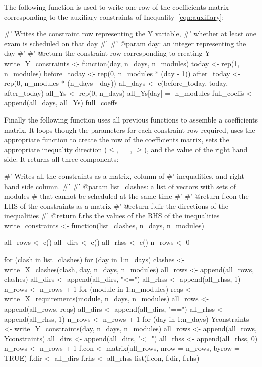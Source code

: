 The following function is used to write one row of the coefficients matrix
corresponding to the auxiliary constraints of Inequality~\ref{eqn:auxiliary}:

\begin{Rin-no-test}
#' Writes the constraint row representing the Y variable,
#' whether at least one exam is scheduled on that day
#'
#' @param day: an integer representing the day
#'
#' @return the constraint row corresponding to creating Y
write_Y_constraints <- function(day, n_days, n_modules){
  today <- rep(1, n_modules)
  before_today <- rep(0, n_modules * (day - 1))
  after_today <- rep(0, n_modules * (n_days - day))
  all_days <- c(before_today, today, after_today)
  all_Ys <- rep(0, n_days)
  all_Ys[day] = -n_modules
  full_coeffs <- append(all_days, all_Ys)
  full_coeffs
}
\end{Rin-no-test}

Finally the following function uses all previous functions
to assemble a coefficients matrix.
It loops though the parameters for each constraint row required, uses the
appropriate function to create the row of the coefficients matrix, sets the
appropriate inequality direction (\(\leq\), \(=\), \(\geq\)), and the value of the
right hand side.
It returns all three components:

\begin{Rin-no-test}
#' Writes all the constraints as a matrix, column of
#' inequalities, and right hand side column.
#'
#' @param list_clashes: a list of vectors with sets of modules
#         that cannot be scheduled at the same time
#'
#' @return f.con the LHS of the constraints as a matrix
#' @return f.dir the directions of the inequalities
#' @return f.rhs the values of the RHS of the inequalities
write_constraints <- function(list_clashes, n_days, n_modules){
  all_rows <- c()
  all_dirs <- c()
  all_rhss <- c()
  n_rows <- 0

  for (clash in list_clashes){
    for (day in 1:n_days){
      clashes <- write_X_clashes(clash, day, n_days, n_modules)
      all_rows <- append(all_rows, clashes)
      all_dirs <- append(all_dirs, "<=")
      all_rhss <- append(all_rhss, 1)
      n_rows <- n_rows + 1
    }
  }
  for (module in 1:n_modules){
    reqs <- write_X_requirements(module, n_days, n_modules)
    all_rows <- append(all_rows, reqs)
    all_dirs <- append(all_dirs, "==")
    all_rhss <- append(all_rhss, 1)
    n_rows <- n_rows + 1
  }
  for (day in 1:n_days){
    Yconstraints <- write_Y_constraints(day, n_days, n_modules)
    all_rows <- append(all_rows, Yconstraints)
    all_dirs <- append(all_dirs, "<=")
    all_rhss <- append(all_rhss, 0)
    n_rows <- n_rows + 1
  }
  f.con <- matrix(all_rows, nrow = n_rows, byrow = TRUE)
  f.dir <- all_dirs
  f.rhs <- all_rhss
  list(f.con, f.dir, f.rhs)
}
\end{Rin-no-test}

